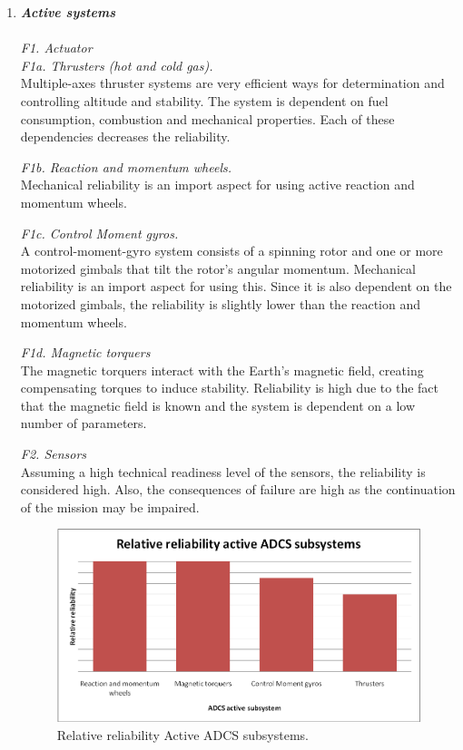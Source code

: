 \begin{enumerate}[A]
	\item  \textbf{\textit{Active systems}} \\\\
\textit{F1. Actuator}\\

\textit{F1a. Thrusters (hot and cold gas).}\\ 
Multiple-axes thruster systems are very efficient ways for determination and controlling altitude and stability. The system is dependent on fuel consumption, combustion and mechanical properties. Each of these dependencies decreases the reliability. 

\textit{F1b. Reaction and momentum wheels.}\\ 
Mechanical reliability is an import aspect for using active reaction and momentum wheels. 

\textit{F1c. Control Moment gyros.}\\ 
A control-moment-gyro system consists of a spinning rotor and one or more motorized gimbals that tilt the rotor's angular momentum. Mechanical reliability is an import aspect for using this. Since it is also dependent on the motorized gimbals, the reliability is slightly lower than the reaction and momentum wheels.

\textit{F1d. Magnetic torquers}\\ 
The magnetic torquers interact with the Earth's magnetic field, creating compensating torques to induce stability. Reliability is high due to the fact that the magnetic field is known and the system is dependent on a low number of parameters.

\textit{F2. Sensors}\\ 
Assuming a high technical readiness level of the sensors, the reliability is considered high. Also, the consequences of failure are high as the continuation of the mission may be impaired.

\begin{figure} [h]
	\begin{center}
 \includegraphics[width=1.0\textwidth,angle=0]{chapters/img/TRA_ADCS_A.png}	
	\caption{Relative reliability Active ADCS subsystems.}
	\label{TRA_ADCS_A}
	\end{center}
\end{figure}


\end{enumerate}
